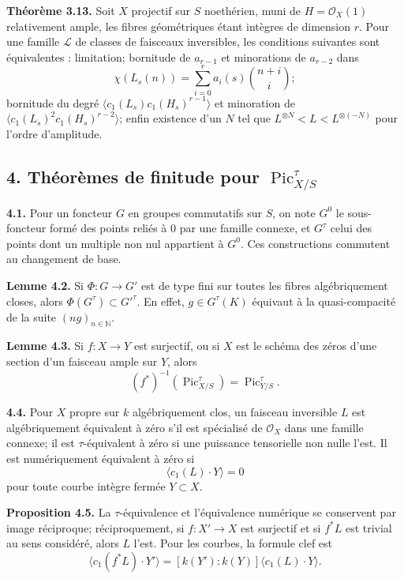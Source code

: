 \documentclass[11pt]{article}
\providecommand{\Pic}{\operatorname{Pic}}
\begin{document}
\textbf{Th\'eor\`eme 3.13.} Soit $X$ projectif sur $S$ noeth\'erien, muni de $H=\mathcal O_X(1)$ relativement ample, les fibres g\'eom\'etriques \'etant int\`egres de dimension $r$. Pour une famille $\mathcal L$ de classes de faisceaux inversibles, les conditions suivantes sont \'equivalentes : limitation; bornitude de $a_{r-1}$ et minorations de $a_{r-2}$ dans
\[
 \chi(L_s(n))=\sum_{i=0}^r a_i(s)\binom{n+i}{i};
\]
bornitude du degr\'e $\langle c_1(L_s)c_1(H_s)^{r-1}\rangle$ et minoration de $\langle c_1(L_s)^2c_1(H_s)^{r-2}\rangle$; enfin existence d'un $N$ tel que $L^{\otimes N}<L<L^{\otimes(-N)}$ pour l'ordre d'amplitude.

\subsection*{4. Th\'eor\`emes de finitude pour $\Pic^\tau_{X/S}$}
\textbf{4.1.} Pour un foncteur $G$ en groupes commutatifs sur $S$, on note $G^0$ le sous-foncteur form\'e des points reli\'es \`a $0$ par une famille connexe, et $G^\tau$ celui des points dont un multiple non nul appartient \`a $G^0$. Ces constructions commutent au changement de base.

\textbf{Lemme 4.2.} Si $\Phi:G\to G'$ est de type fini sur toutes les fibres alg\'ebriquement closes, alors $\Phi(G^\tau)\subset G'^\tau$. En effet, $g\in G^\tau(K)$ \'equivaut \`a la quasi-compacit\'e de la suite $(ng)_{n\in\mathbb N}$.

\textbf{Lemme 4.3.} Si $f:X\to Y$ est surjectif, ou si $X$ est le sch\'ema des z\'eros d'une section d'un faisceau ample sur $Y$, alors
\[
 (f^*)^{-1}(\Pic^\tau_{X/S})=\Pic^\tau_{Y/S}.
\]

\textbf{4.4.} Pour $X$ propre sur $k$ alg\'ebriquement clos, un faisceau inversible $L$ est alg\'ebriquement \'equivalent \`a z\'ero s'il est sp\'ecialis\'e de $\mathcal O_X$ dans une famille connexe; il est $\tau$-\'equivalent \`a z\'ero si une puissance tensorielle non nulle l'est. Il est num\'eriquement \'equivalent \`a z\'ero si
\[
 \langle c_1(L)\cdot Y\rangle=0
\]
pour toute courbe int\`egre ferm\'ee $Y\subset X$.

\textbf{Proposition 4.5.} La $\tau$-\'equivalence et l'\'equivalence num\'erique se conservent par image r\'eciproque; r\'eciproquement, si $f:X'\to X$ est surjectif et si $f^*L$ est trivial au sens consid\'er\'e, alors $L$ l'est. Pour les courbes, la formule clef est
\[
 \langle c_1(f^*L)\cdot Y'\rangle=[k(Y'):k(Y)]\langle c_1(L)\cdot Y\rangle.
\]
\end{document}
